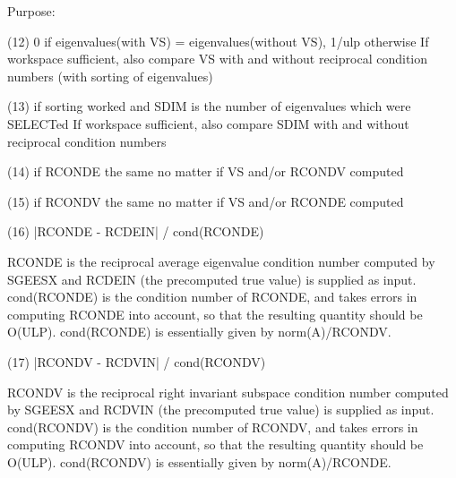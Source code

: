 \begin{DoxyParagraph}{Purpose\+: }
\begin{DoxyVerb}
    (12)    0     if eigenvalues(with VS) = eigenvalues(without VS),
            1/ulp otherwise
            If workspace sufficient, also compare VS with and without
            reciprocal condition numbers
            (with sorting of eigenvalues)

    (13)    if sorting worked and SDIM is the number of
            eigenvalues which were SELECTed
            If workspace sufficient, also compare SDIM with and
            without reciprocal condition numbers

    (14)    if RCONDE the same no matter if VS and/or RCONDV computed

    (15)    if RCONDV the same no matter if VS and/or RCONDE computed

    (16)  |RCONDE - RCDEIN| / cond(RCONDE)

       RCONDE is the reciprocal average eigenvalue condition number
       computed by SGEESX and RCDEIN (the precomputed true value)
       is supplied as input.  cond(RCONDE) is the condition number
       of RCONDE, and takes errors in computing RCONDE into account,
       so that the resulting quantity should be O(ULP). cond(RCONDE)
       is essentially given by norm(A)/RCONDV.

    (17)  |RCONDV - RCDVIN| / cond(RCONDV)

       RCONDV is the reciprocal right invariant subspace condition
       number computed by SGEESX and RCDVIN (the precomputed true
       value) is supplied as input. cond(RCONDV) is the condition
       number of RCONDV, and takes errors in computing RCONDV into
       account, so that the resulting quantity should be O(ULP).
       cond(RCONDV) is essentially given by norm(A)/RCONDE.\end{DoxyVerb}
 
\end{DoxyParagraph}


